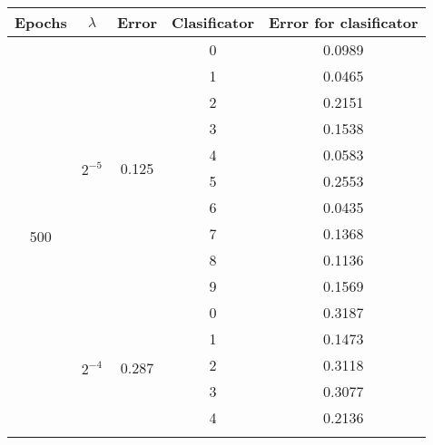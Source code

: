 \documentclass[a4paper,12pt]{article}
\begin{document}
\begin{table}[h]
\begin{tabular}{ |c|c|c|c|c| }
\hline
Epochs                & $\lambda$ & Error & Clasificator & Error for clasificator  \\ \hline
\multirow{30}{*}{500} &              \multirow{10}{*}{$2^{-5}$} & \multirow{10}{*}{0.125} & 0 & 0.0989 \\ \cline{4-5} 
                      &                                         &                         & 1 & 0.0465 \\ \cline{4-5} 
                      &                                         &                         & 2 & 0.2151 \\ \cline{4-5} 
                      &                                         &                         & 3 & 0.1538 \\ \cline{4-5} 
                      &                                         &                         & 4 & 0.0583 \\ \cline{4-5} 
                      &                                         &                         & 5 & 0.2553 \\ \cline{4-5} 
                      &                                         &                         & 6 & 0.0435 \\ \cline{4-5} 
                      &                                         &                         & 7 & 0.1368 \\ \cline{4-5} 
                      &                                         &                         & 8 & 0.1136 \\ \cline{4-5} 
                      &                                         &                         & 9 & 0.1569 \\ \cline{2-5}
                      & \multirow{10}{*}{$2^{-4}$}              & \multirow{10}{*}{0.287} & 0 & 0.3187 \\ \cline{4-5} 
                      &                                         &                         & 1 & 0.1473 \\ \cline{4-5} 
                      &                                         &                         & 2 & 0.3118 \\ \cline{4-5} 
                      &                                         &                         & 3 & 0.3077 \\ \cline{4-5} 
                      &                                         &                         & 4 & 0.2136 \\ \cline{4-5} 

\end{tabular}
\end{table}
\end{document}
